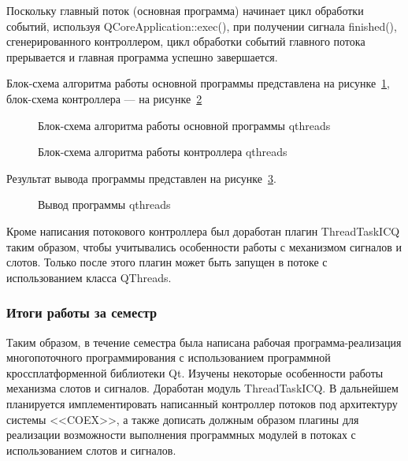Поскольку главный поток (основная программа) начинает цикл обработки событий, используя QCoreApplication::exec(), при получении сигнала finished(), сгенерированного контроллером, цикл обработки событий главного потока прерывается и главная программа успешно завершается. 

Блок-схема алгоритма работы основной программы представлена на рисунке~\ref{main-qthreads:main-qthreads}, блок-схема контроллера --- на рисунке~\ref{controller-qthreads:controller-qthreads} 

\begin{figure}[h!]
\caption{ Блок-схема алгоритма работы основной программы qthreads }
\label{main-qthreads:main-qthreads}
\end{figure}

\clearpage

\begin{figure}[ht]
\caption{ Блок-схема алгоритма работы контроллера qthreads }
\label{controller-qthreads:controller-qthreads}
\end{figure}

\clearpage

Результат вывода программы представлен на рисунке~\ref{program-output:program-output}.

\begin{figure}[h!]
\caption{ Вывод программы qthreads }
\label{program-output:program-output}
\end{figure}

Кроме написания потокового контроллера был доработан плагин ThreadTaskICQ таким образом, чтобы учитывались особенности работы с механизмом сигналов и слотов. Только после этого плагин может быть запущен в потоке с использованием класса QThreads.  

\subsubsection{Итоги работы за семестр}

Таким образом, в течение семестра была написана рабочая программа-реализация многопоточного программирования с использованием программной кроссплатформенной библиотеки Qt. Изучены некоторые особенности работы механизма слотов и сигналов. Доработан модуль ThreadTaskICQ. В дальнейшем планируется имплементировать написанный контроллер потоков под архитектуру системы <<COEX>>, а также дописать должным образом плагины для реализации возможности выполнения программных модулей в потоках с использованием слотов и сигналов. 



